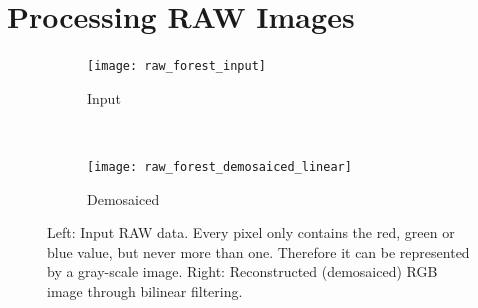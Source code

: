 \documentclass[a4paper]{article}
\begin{document}
\section{Processing RAW Images}
\begin{figure}[H]
	\centering
	\vspace{3mm}
	\begin{subfigure}[h]{0.48\textwidth}
		\centering
		\texttt{[image: raw\_forest\_input]}
		\caption*{Input}
	\end{subfigure}
	~
	\begin{subfigure}[h]{0.48\textwidth}
		\centering
		\texttt{[image: raw\_forest\_demosaiced\_linear]}
		\caption*{Demosaiced}
	\end{subfigure}	
\caption{Left: Input RAW data. Every pixel only contains the red, green or blue value, but never more than one. Therefore it can be represented by a gray-scale image. Right: Reconstructed (demosaiced) RGB image through bilinear filtering.}
\label{fig:demosaicLin}
\end{figure}
\end{document}
